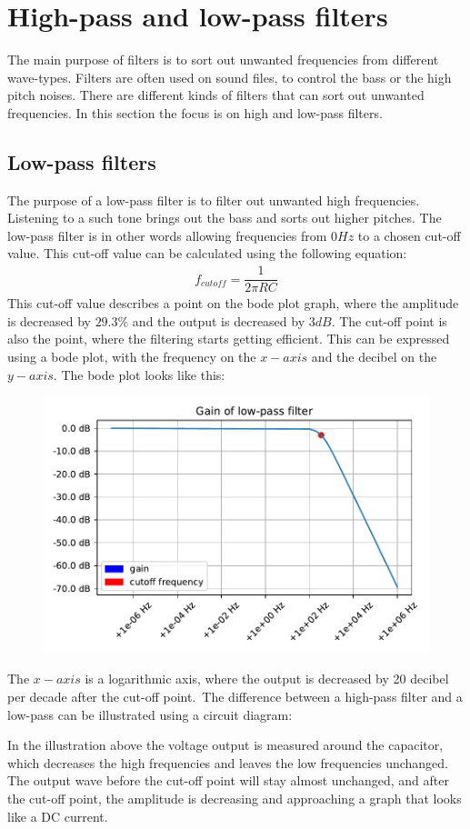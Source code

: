 \chapter{High-pass and low-pass filters}
The main purpose of filters is to sort out unwanted frequencies from different wave-types. Filters are often used on sound files, to control the bass or the high pitch noises. There are different kinds of filters that can sort out unwanted frequencies. In this section the focus is on high and low-pass filters.

\section{Low-pass filters}
The purpose of a low-pass filter is to filter out unwanted high frequencies. Listening to a such tone brings out the bass and sorts out higher pitches. The low-pass filter is in other words allowing frequencies from $0Hz$ to a chosen cut-off value. This cut-off value can be calculated using the following equation:
\begin{align*}
f_{cutoff}=\dfrac{1}{2 \pi RC}
\end{align*}
This cut-off value describes a point on the bode plot graph, where the amplitude is decreased by $29.3\%$ and the output is decreased by $3dB$. The cut-off point is also the point, where the filtering starts getting efficient. This can be expressed using a bode plot, with the frequency on the $x-axis$ and the decibel on the $y-axis$. The bode plot looks like this:
\begin{figure}[H]
\center
	\includegraphics[scale=0.7]{fig/img/bode_plot_LPF}
\end{figure}
The $x-axis$ is a logarithmic axis, where the output is decreased by 20 decibel per decade after the cut-off point.\
The difference between a high-pass filter and a low-pass can be illustrated using a circuit diagram:
\begin{figure}[H]
	
\end{figure}
In the illustration above the voltage output is measured around the capacitor, which decreases the high frequencies and leaves the low frequencies unchanged. The output wave before the cut-off point will stay almost unchanged, and after the cut-off point, the amplitude is decreasing and approaching a graph that looks like a DC current. 


